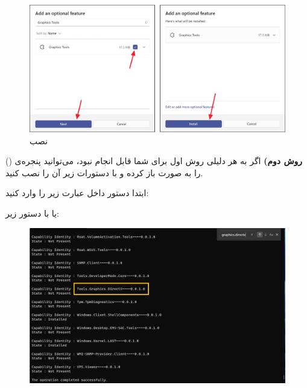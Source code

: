 {\begin{spacing}{1.5}
        \begin{figure}[H]
            \centering
            \setlength{\belowcaptionskip}{-10pt}
            \includegraphics[width=\textwidth]{Images/3/3.Intro.4.2}
            \caption{نصب }
            \label{fig:3.Intro.4.2}
        \end{figure}
        \textbf{روش دوم)}
        اگر به هر دلیلی روش اول برای شما قابل انجام نبود، می‌توانید پنجره‌ی  () را به صورت  باز کرده و با دستورات زیر آن را نصب کنید.

        ابتدا دستور داخل  عبارت زیر را وارد کنید:

        \begin{flushleft}
        \end{flushleft}

        یا با دستور زیر:

        \begin{flushleft}
        \end{flushleft}
        \textbf{\vspace{-10pt}}

        \begin{figure}[H]
            \centering
            \setlength{\belowcaptionskip}{-10pt}
            \includegraphics[width=\textwidth]{Images/3/3.Intro.4.3}
            \caption*{}
        \end{figure}
        \textbf{\vspace{-20pt}}


\end{spacing}}
